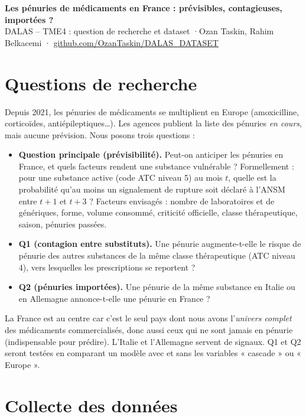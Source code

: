 \documentclass[10pt,a4paper]{article}
\newcommand{\nb}[1]{\textbf{#1}}
\begin{document}
\begin{center}
{\large\bfseries Les pénuries de médicaments en France : prévisibles, contagieuses, importées ?}\\[2pt]
{\small DALAS -- TME4 : question de recherche et dataset \quad·\quad Ozan Taskin, Rahim Belkacemi \quad·\quad
\href{https://github.com/OzanTaskin/DALAS_DATASET}{github.com/OzanTaskin/DALAS\_DATASET}}
\end{center}

\section{Questions de recherche}

Depuis 2021, les pénuries de médicaments se multiplient en Europe (amoxicilline, corticoïdes, antiépileptiques…).
Les agences publient la liste des pénuries \emph{en cours}, mais aucune prévision. Nous posons trois questions :

\begin{itemize}
  \item \nb{Question principale (prévisibilité).} Peut-on anticiper les pénuries en France, et quels facteurs rendent une
  substance vulnérable ? Formellement : pour une substance active (code ATC niveau 5) au mois $t$, quelle est la probabilité
  qu'au moins un signalement de rupture soit déclaré à l'ANSM entre $t+1$ et $t+3$ ? Facteurs envisagés : nombre de
  laboratoires et de génériques, forme, volume consommé, criticité officielle, classe thérapeutique, saison, pénuries passées.
  \item \nb{Q1 (contagion entre substituts).} Une pénurie augmente-t-elle le risque de pénurie des autres substances de la
  même classe thérapeutique (ATC niveau 4), vers lesquelles les prescriptions se reportent ?
  \item \nb{Q2 (pénuries importées).} Une pénurie de la même substance en Italie ou en Allemagne annonce-t-elle une pénurie en France ?
\end{itemize}

La France est au centre car c'est le seul pays dont nous avons l'\emph{univers complet} des médicaments commercialisés,
donc aussi ceux qui ne sont jamais en pénurie (indispensable pour prédire). L'Italie et l'Allemagne servent de signaux.
Q1 et Q2 seront testées en comparant un modèle avec et sans les variables « cascade » ou « Europe ».

\section{Collecte des données}
\end{document}
